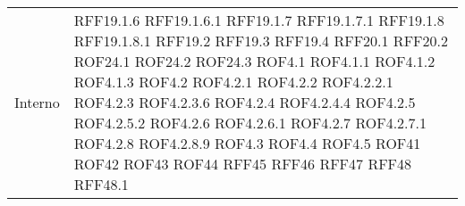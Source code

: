 \begin{longtable}{p{2.5cm}!{\VRule[1pt]}p{2.5cm}}
	Interno & RFF19.1.6 \newline RFF19.1.6.1 \newline RFF19.1.7 \newline RFF19.1.7.1 \newline RFF19.1.8 \newline RFF19.1.8.1 \newline RFF19.2 \newline RFF19.3 \newline RFF19.4 \newline RFF20.1 \newline RFF20.2 \newline ROF24.1 \newline ROF24.2 \newline ROF24.3 \newline ROF4.1 \newline ROF4.1.1 \newline ROF4.1.2 \newline ROF4.1.3 \newline ROF4.2 \newline ROF4.2.1 \newline ROF4.2.2 \newline ROF4.2.2.1 \newline ROF4.2.3 \newline ROF4.2.3.6 \newline ROF4.2.4 \newline ROF4.2.4.4 \newline ROF4.2.5 \newline ROF4.2.5.2 \newline ROF4.2.6 \newline ROF4.2.6.1 \newline ROF4.2.7 \newline ROF4.2.7.1 \newline ROF4.2.8 \newline ROF4.2.8.9 \newline ROF4.3 \newline ROF4.4 \newline ROF4.5 \newline ROF41 \newline ROF42 \newline ROF43 \newline ROF44 \newline RFF45 \newline RFF46 \newline RFF47 \newline RFF48 \newline RFF48.1 \\

\end{longtable}
